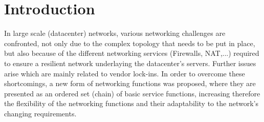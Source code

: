 \section{Introduction}
In large scale (datacenter) networks, various networking challenges are confronted,
not only due to the complex topology that needs to be put in place, but
also because of the different networking services (Firewalls, NAT,...) required to
ensure a resilient network underlaying the datacenter’s servers. Further issues
arise which are mainly related to vendor lock-ins. In order to overcome these
shortcomings, a new form of networking functions was proposed, where they
are presented as an ordered set (chain) of basic service functions, increasing
therefore the flexibility of the networking functions and their adaptability to
the network’s changing requirements.\\

